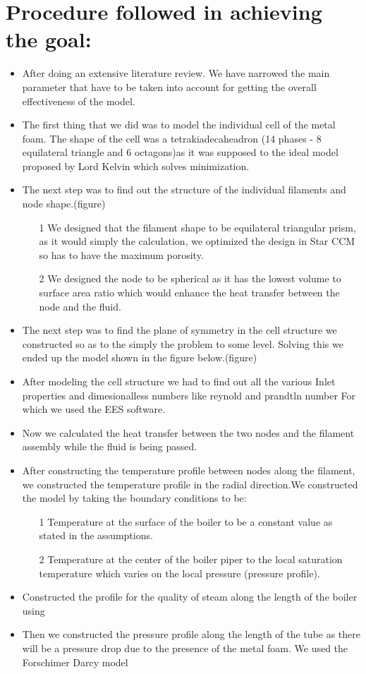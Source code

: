 \documentclass[compileTAMUreport.tex]{subfiles}
\begin{document}
\section{Procedure followed in achieving the goal:}
\begin{itemize}
\item After doing an extensive literature review. We have narrowed the main parameter that have to be taken into account for getting the overall effectiveness of the model.
\item The first thing that we did was to model the individual cell of the metal foam. The shape of the cell was a tetrakiadecaheadron (14 phases - 8 equilateral triangle and 6 octagons)as it was supposed to the ideal model proposed by Lord Kelvin which solves minimization.
\item The next step was to find out the structure of the individual filaments and node shape.(figure)
\begin{itemize}

\item[1] We designed that the filament shape to be equilateral triangular prism, as it would simply the calculation, we optimized the design in Star CCM so has to have the maximum porosity.
\item[2] We designed the node to be spherical as it has the lowest volume to surface area ratio which would enhance the heat transfer between the node and the fluid.
\end{itemize}
\item	The next step was to find the plane of symmetry in the cell structure we constructed so as to the simply the problem to some level. Solving this we ended up the model shown in the figure below.(figure)
\item After modeling the cell structure we had to find out all the various Inlet properties and dimesionalless numbers like reynold and prandtln number For which we used the EES software.
\item	Now we calculated the heat transfer between the two nodes and the filament assembly while the fluid is being passed.\cite{Incropera}
\item After constructing the temperature profile between nodes along the filament, we constructed the temperature profile in the radial direction.We constructed the model by taking the boundary conditions to be: 
\begin{itemize}

\item[1]Temperature at the surface of the boiler to be a constant value as stated in the assumptions.
\item[2]Temperature at the center of the boiler piper to the local saturation temperature which varies on the local pressure (pressure profile).
\end{itemize}
\item	Constructed the profile for the quality of steam along the length of the boiler using 
\item	Then we constructed the pressure profile along the length of the tube as there will be a pressure drop due to the presence of the metal foam.  We used the Forschimer Darcy model \cite{Xu2012}


\end{itemize}
\end{document}
